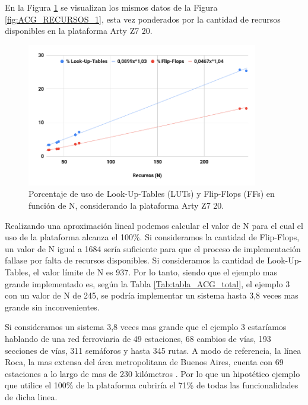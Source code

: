 	En la Figura \ref{fig:ACG_RECURSOS_2} se visualizan los mismos datos de la Figura \ref{fig:ACG_RECURSOS_1}, esta vez ponderados por la cantidad de recursos disponibles en la plataforma Arty Z7 20.
	
	\begin{figure}[H]
		\centering
		\includegraphics[origin = c, width=0.9\textwidth]{resultados-obtenidos/ejemplo1/images/recursos_2}
		\centering\caption{Porcentaje de uso de Look-Up-Tables (LUTs) y Flip-Flops (FFs) en función de N, considerando la plataforma Arty Z7 20.}
		\label{fig:ACG_RECURSOS_2}
	\end{figure}
	
	Realizando una aproximación lineal podemos calcular el valor de N para el cual el uso de la plataforma alcanza el 100\%. Si consideramos la cantidad de Flip-Flops, un valor de N igual a 1684 sería suficiente para que el proceso de implementación fallase por falta de recursos disponibles. Si consideramos la cantidad de Look-Up-Tables, el valor límite de N es 937. Por lo tanto, siendo que el ejemplo mas grande implementado es, según la Tabla \ref{Tab:tabla_ACG_total}, el ejemplo 3 con un valor de N de 245, se podría implementar un sistema hasta 3,8 veces mas grande sin inconvenientes.
	
	 Si consideramos un sistema 3,8 veces mas grande que el ejemplo 3 estaríamos hablando de una red ferroviaria de 49 estaciones, 68 cambios de vías, 193 secciones de vías, 311 semáforos y hasta 345 rutas. A modo de referencia, la línea Roca, la mas extensa del área metropolitana de Buenos Aires, cuenta con 69 estaciones a lo largo de mas de 230 kilómetros \cite{TRENES}. Por lo que un hipotético ejemplo que utilice el 100\% de la plataforma cubriría el 71\% de todas las funcionalidades de dicha linea.
	
